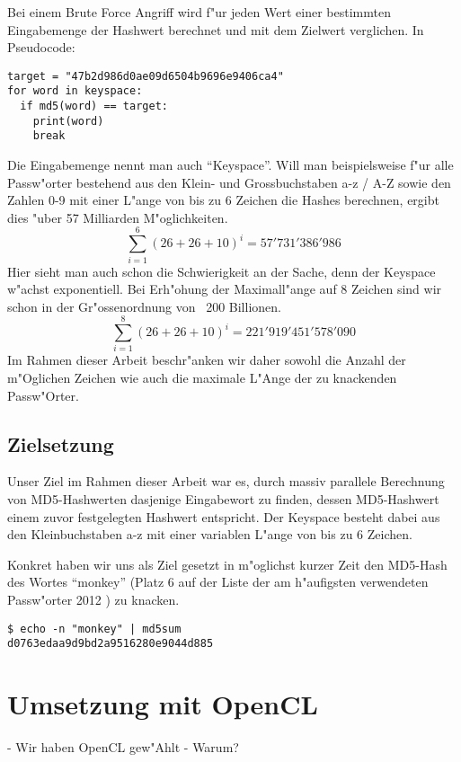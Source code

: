 \begin{refsection}
Bei einem Brute Force Angriff wird f"ur jeden Wert einer bestimmten
Eingabemenge der Hash\-wert berechnet und mit dem Zielwert verglichen. In
Pseudocode:

\begin{verbatim}
target = "47b2d986d0ae09d6504b9696e9406ca4"
for word in keyspace:
  if md5(word) == target:
    print(word)
    break
\end{verbatim}

Die Eingabemenge nennt man auch ``Keyspace''. Will man beispielsweise f"ur alle
Passw"orter bestehend aus den Klein- und Grossbuchstaben a-z / A-Z sowie den
Zahlen 0-9 mit einer L"ange von bis zu 6 Zeichen die Hashes berechnen, ergibt
dies "uber 57 Milliarden M"oglichkeiten.
\[
	\sum_{i=1}^{6} \left(26 + 26 + 10\right)^i = 57'731'386'986
\]
Hier sieht man auch schon die Schwierigkeit an der Sache, denn der Keyspace
w"achst exponentiell. Bei Erh"ohung der Maximall"ange auf 8 Zeichen sind wir schon
in der Gr"ossenordnung von ~200 Billionen.
\[
	\sum_{i=1}^{8} \left(26 + 26 + 10\right)^i = 221'919'451'578'090
\]
Im Rahmen dieser Arbeit beschr"anken wir daher sowohl die Anzahl der m"Oglichen
Zeichen wie auch die maximale L"Ange der zu knackenden Passw"Orter.

\subsection{Zielsetzung}

Unser Ziel im Rahmen dieser Arbeit war es, durch massiv parallele Berechnung von
MD5-Hashwerten dasjenige Eingabewort zu finden, dessen MD5-Hashwert einem zuvor
festgelegten Hashwert entspricht. Der Keyspace besteht dabei aus den
Kleinbuchstaben a-z mit einer variablen L"ange von bis zu 6 Zeichen.

Konkret haben wir uns als Ziel gesetzt in m"oglichst kurzer Zeit den MD5-Hash
des Wortes ``monkey'' (Platz 6 auf der Liste der am h"aufigsten verwendeten
Passw"orter 2012 \cite{crypto:splash2012}) zu knacken.

\begin{verbatim}
$ echo -n "monkey" | md5sum
d0763edaa9d9bd2a9516280e9044d885
\end{verbatim}

\section{Umsetzung mit OpenCL}

- Wir haben OpenCL gew"Ahlt
- Warum?


\end{refsection}
